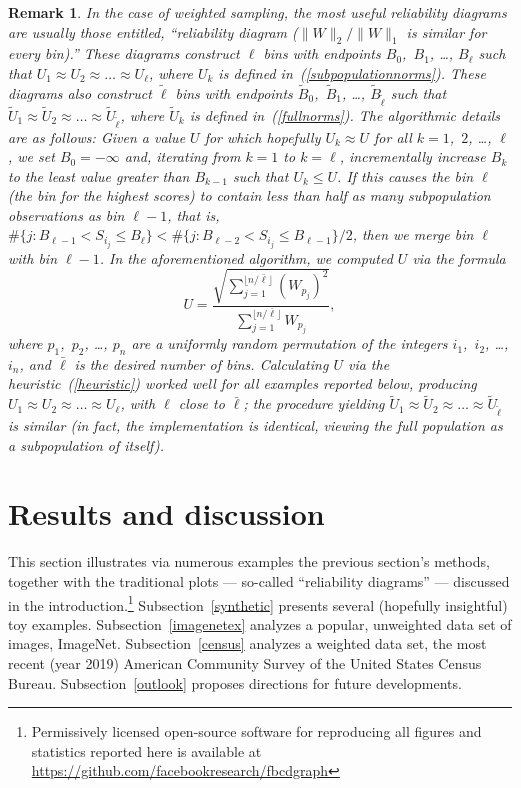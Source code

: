\documentclass{article}
\newtheorem{remark1}[theorem]{Remark}
\newenvironment{remark}{\begin{remark1} \rm}{\end{remark1}}
\begin{document}
\begin{remark}
\label{equierrs}
In the case of weighted sampling, the most useful reliability diagrams
are usually those entitled,
``reliability diagram ($\|W\|_2/\|W\|_1$ is similar for every bin).''
These diagrams construct $\ell$ bins with endpoints
$B_0$,~$B_1$, \dots, $B_{\ell}$ such that
$U_1 \approx U_2 \approx \dots \approx U_{\ell}$,
where $U_k$ is defined in~(\ref{subpopulationnorms}).
These diagrams also construct $\tilde{\ell}$ bins with endpoints
$\tilde{B}_0$,~$\tilde{B}_1$, \dots, $\tilde{B}_{\tilde{\ell}}$ such that
$\tilde{U}_1 \approx \tilde{U}_2 \approx \dots
\approx \tilde{U}_{\tilde{\ell}}$,
where $\tilde{U}_k$ is defined in~(\ref{fullnorms}).
The algorithmic details are as follows:
Given a value $U$ for which hopefully $U_k \approx U$
for all $k = 1$,~$2$, \dots, $\ell$,
we set $B_0 = -\infty$ and, iterating from $k = 1$ to $k = \ell$,
incrementally increase $B_k$ to the least value greater than $B_{k-1}$
such that $U_k \le U$.
If this causes the bin $\ell$ (the bin for the highest scores)
to contain less than half as many subpopulation observations as bin $\ell-1$,
that is, $\#\{j : B_{\ell-1} < S_{i_j} \le B_{\ell}\}
< \#\{j : B_{\ell-2} < S_{i_j} \le B_{\ell-1}\} / 2$,
then we merge bin $\ell$ with bin $\ell-1$.
In the aforementioned algorithm, we computed $U$ via the formula
%
\begin{equation}
\label{heuristic}
U = \frac{\sqrt{\sum_{j = 1}^{\lfloor n / \bar{\ell} \rfloor} (W_{p_j})^2}}
         {\sum_{j = 1}^{\lfloor n / \bar{\ell} \rfloor} W_{p_j}},
\end{equation}
%
where $p_1$,~$p_2$, \dots, $p_n$ are a uniformly random permutation
of the integers $i_1$,~$i_2$, \dots, $i_n$,
and $\bar{\ell}$ is the desired number of bins.
Calculating $U$ via the heuristic~(\ref{heuristic}) worked well
for all examples reported below,
producing $U_1 \approx U_2 \approx \dots \approx U_\ell$,
with $\ell$ close to $\bar{\ell}$; the procedure yielding $\tilde{U}_1
\approx \tilde{U}_2 \approx \dots \approx \tilde{U}_{\tilde{\ell}}$ is similar
(in fact, the implementation is identical, viewing the full population
as a subpopulation of itself).
\end{remark}



\section{Results and discussion}
\label{results}


This section illustrates via numerous examples
the previous section's methods,
together with the traditional plots --- so-called ``reliability diagrams'' ---
discussed in the introduction.\footnote{Permissively licensed
open-source software for reproducing all figures
and statistics reported here is available at
\url{https://github.com/facebookresearch/fbcdgraph}}
Subsection~\ref{synthetic} presents several (hopefully insightful)
toy examples.
Subsection~\ref{imagenetex} analyzes a popular, unweighted data set of images,
ImageNet.
Subsection~\ref{census} analyzes a weighted data set,
the most recent (year 2019) American Community Survey
of the United States Census Bureau.
Subsection~\ref{outlook} proposes directions for future developments.
\end{document}
